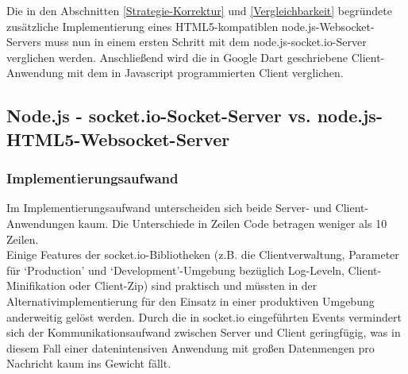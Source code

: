 Die in den Abschnitten  \ref{Strategie-Korrektur} und \ref{Vergleichbarkeit} begründete zusätzliche Implementierung eines HTML5-kompatiblen node.js-Websocket-Servers muss nun in einem ersten Schritt mit dem node.js-socket.io-Server verglichen werden. Anschließend wird die in Google Dart geschriebene Client-Anwendung mit dem in Javascript programmierten Client verglichen.
\subsection{Node.js - socket.io-Socket-Server vs. node.js-HTML5-Websocket-Server}\label{socket.io- vs html5-Server}
\subsubsection{Implementierungsaufwand}
Im Implementierungsaufwand unterscheiden sich beide Server- und Client-Anwendungen kaum. Die Unterschiede in Zeilen Code betragen weniger als 10 Zeilen.\\
Einige Features der socket.io-Bibliotheken (z.B. die Clientverwaltung, Parameter für ‘Production’ und ‘Development’-Umgebung bezüglich Log-Leveln, Client-Minifikation oder Client-Zip) sind praktisch und müssten in der Alternativimplementierung für den Einsatz in einer produktiven Umgebung anderweitig gelöst werden. Durch die in socket.io eingeführten Events vermindert sich der Kommunikationsaufwand zwischen Server und Client geringfügig, was in diesem Fall einer datenintensiven Anwendung mit großen Datenmengen pro Nachricht kaum ins Gewicht fällt.
